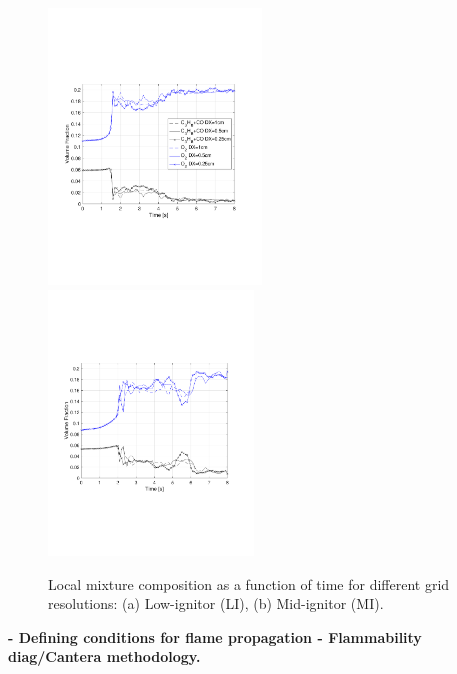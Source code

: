 \documentclass[12pt,letterpaper]{article}
\begin{document}
\begin{flushleft}
\begin{figure}[tb]
    \centering
    \includegraphics[trim = 14.5mm 65mm 17mm 70mm, clip,width=0.505\textwidth]{AOSFST_Paper/Figures/Low_Ignitor_Comp_Tvar_300s.pdf}
    \includegraphics[trim = 22mm 65mm 17mm 70mm, clip,width=0.485\textwidth]{AOSFST_Paper/Figures/Mid_Ignitor_Comp_Tvar_300s.pdf}
     \\
    \caption{Local mixture composition as a function of time for different grid resolutions: (a) Low-ignitor (LI), (b) Mid-ignitor (MI). }
    \label{fig:CompSetup}
\end{figure}



\textbf{- Defining conditions for flame propagation - Flammability diag/Cantera methodology.}







\end{flushleft}
\end{document}
